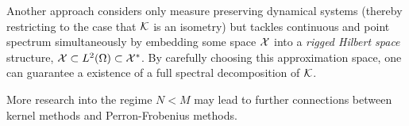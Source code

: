 Another approach \cite{rigged} considers only measure preserving dynamical systems 
(thereby restricting to the case that $\mathcal{K}$ is an isometry) but tackles continuous and 
point spectrum simultaneously by embedding some space $\mathcal{X}$ into a \emph{rigged Hilbert 
space} structure, $\mathcal{X} \subset L^2 (\Omega) \subset \mathcal{X}^*$. By carefully choosing this 
approximation space, one can guarantee a existence of a full spectral decomposition of 
$\mathcal{K}$. 

More research into the regime $N < M$ may lead to further connections between kernel 
methods and Perron-Frobenius methods. 


